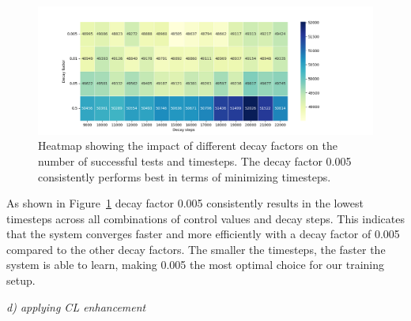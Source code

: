 \begin{figure}[h] 
	\centering 
	\includegraphics[width=15cm]{Figures/MaxSuccessfulTestsTimesteps_heatmap.png} 
	\caption{Heatmap showing the impact of different decay factors on the number of successful tests and timesteps. The decay factor 0.005 consistently performs best in terms of minimizing timesteps.} 
	\label{fig: decay factors comparison}
\end{figure}

As shown in Figure~\ref{fig: decay factors comparison} decay factor 0.005 consistently results in the lowest timesteps across all combinations of control values and decay steps. This indicates that the system converges faster and more efficiently with a decay factor of 0.005 compared to the other decay factors. The smaller the timesteps, the faster the system is able to learn, making 0.005 the most optimal choice for our training setup.

\textit{d) applying CL enhancement}


